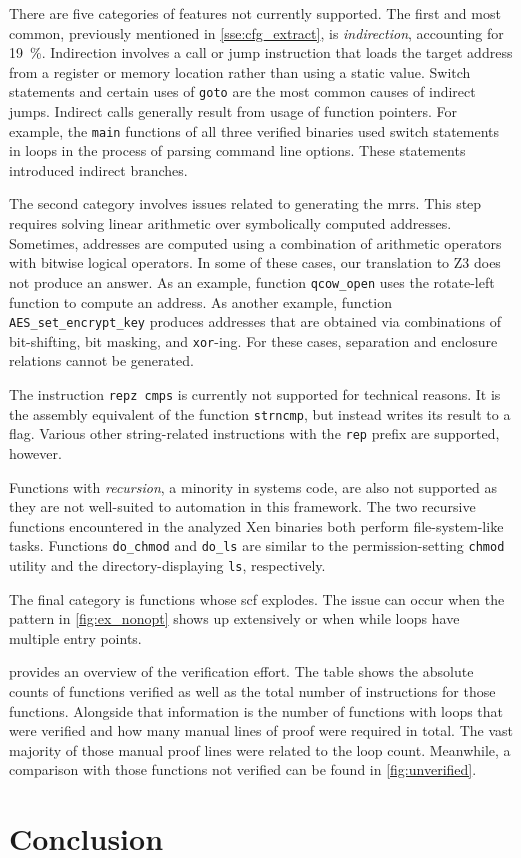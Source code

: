 There are five categories of features not currently supported.
The first and most common, previously mentioned in \cref{sse:cfg_extract},
is \emph{indirection}, accounting for \SI{19}{\percent}.%
Indirection involves a call or jump instruction
that loads the target address from a register or memory location
rather than using a static value.
Switch statements and certain uses of \texttt{goto}
are the most common causes of indirect jumps.
Indirect calls generally result from usage of function pointers.
For example, the \lstinline|main| functions of all three verified binaries
used switch statements in loops in the process of parsing command line options.
These statements introduced indirect branches.

The second category involves issues related to generating the \acp{mrr}.
This step requires solving linear arithmetic over symbolically computed addresses.%
Sometimes, addresses are computed using a combination of arithmetic operators%
with bitwise logical operators.%
In some of these cases, our translation to Z3 does not produce an answer.%
As an example, function \texttt{qcow\_open}
uses the rotate-left function to compute an address.
As another example, function \texttt{AES\_set\_encrypt\_key}
produces addresses that are obtained via combinations of bit-shifting,
bit masking, and \texttt{xor}-ing.
For these cases, separation and enclosure relations cannot be generated.

The instruction \texttt{repz cmps} is currently not supported for technical reasons.
It is the assembly equivalent of the function \texttt{strncmp},
but instead writes its result to a flag.
Various other string-related instructions with the \texttt{rep} prefix are supported,
however.

Functions with \emph{recursion}, a minority in systems code, are also not supported
as they are not well-suited to automation in this framework.
The two recursive functions encountered in the analyzed Xen binaries
both perform file-system-like tasks.
Functions \lstinline|do_chmod| and \lstinline|do_ls|
are similar to the permission-setting \lstinline|chmod| utility
and the directory-displaying \lstinline|ls|, respectively.

The final category is functions whose \ac{scf} explodes.
The issue can occur when the pattern in \cref{fig:ex_nonopt} shows up extensively
or when while loops have multiple entry points.

 provides an overview of the verification effort.
The table shows the absolute counts of functions verified
as well as the total number of instructions for those functions.
Alongside that information is the number of functions with loops
that were verified and how many manual lines of proof were required in total.
The vast majority of those manual proof lines were related to the loop count.
Meanwhile, a comparison with those functions not verified
can be found in \cref{fig:unverified}.

\section{Conclusion}
